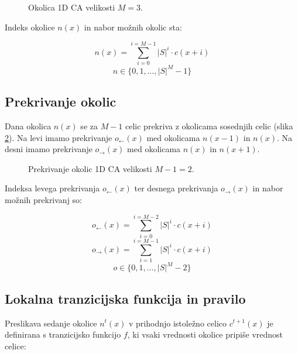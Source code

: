 \documentclass[12pt,a4paper,openany,twoside]{book}
\begin{document}
\begin{figure}[htb]
\centerline{}
\caption[Okolica 1D CA.]{Okolica 1D CA velikosti \(M=3\).}
\label{neighborhood_1d}
\end{figure}
\vspace{5mm}

Indeks okolice \(n(x)\) in nabor možnih okolic sta:

\begin{equation}
n(x) = \sum_{i=0}^{i=M-1} |S|^i \cdot c(x+i)
\end{equation}
\begin{equation}
n \in \{0, 1, \ldots, |S|^M-1\}
\end{equation}

\subsection{Prekrivanje okolic}

Dana okolica \(n(x)\) se za \(M-1\) celic prekriva z okolicama sosednjih celic (slika \ref{overlap_1d}).
Na levi imamo prekrivanje \(o_{\leftarrow}(x)\) med okolicama \(n(x-1)\) in \(n(x)\).
Na desni imamo prekrivanje \(o_{\rightarrow}(x)\) med okolicama \(n(x)\) in \(n(x+1)\).

\begin{figure}[htb]
\centerline{}
\caption[Prekrivanje okolic 1D CA.]{Prekrivanje okolic 1D CA velikosti \(M-1=2\).}
\label{overlap_1d}
\end{figure}

Indeksa levega prekrivanja \(o_{\leftarrow}(x)\) ter desnega prekrivanja \(o_{\rightarrow}(x)\) in nabor možnih prekrivanj so:

\begin{equation}
o_{\leftarrow}(x) = \sum_{i=0}^{i=M-2} |S|^i \cdot c(x+i)
\end{equation}
\begin{equation}
o_{\rightarrow}(x) = \sum_{i=1}^{i=M-1} |S|^i \cdot c(x+i)
\end{equation}
\begin{equation}
o \in \{0, 1, \ldots, |S|^M-2\}
\end{equation}

\subsection{Lokalna tranzicijska funkcija in pravilo}

Preslikava sedanje okolice \(n^{t}(x)\) v prihodnjo istoležno celico \(c^{t+1}(x)\) je definirana
s tranzicijsko funkcijo \(f\), ki vsaki vrednosti okolice pripiše vrednost celice:
\end{document}
